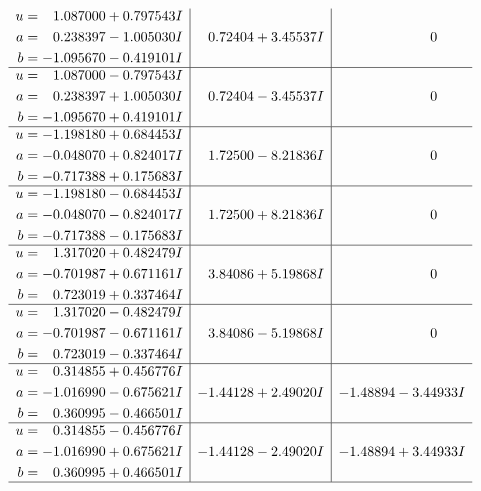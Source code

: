 \documentclass[1p]{elsarticle_modified}
\theoremstyle{definition}
\begin{document}
$$\begin{array}{c|c|c}
\begin{aligned}
u &= \phantom{-}1.087000 + 0.797543 I \\
a &= \phantom{-}0.238397 - 1.005030 I \\
b &= -1.095670 - 0.419101 I\end{aligned}
 & \phantom{-}0.72404 + 3.45537 I & \phantom{-0.000000 } 0 \\ \hline\begin{aligned}
u &= \phantom{-}1.087000 - 0.797543 I \\
a &= \phantom{-}0.238397 + 1.005030 I \\
b &= -1.095670 + 0.419101 I\end{aligned}
 & \phantom{-}0.72404 - 3.45537 I & \phantom{-0.000000 } 0 \\ \hline\begin{aligned}
u &= -1.198180 + 0.684453 I \\
a &= -0.048070 + 0.824017 I \\
b &= -0.717388 + 0.175683 I\end{aligned}
 & \phantom{-}1.72500 - 8.21836 I & \phantom{-0.000000 } 0 \\ \hline\begin{aligned}
u &= -1.198180 - 0.684453 I \\
a &= -0.048070 - 0.824017 I \\
b &= -0.717388 - 0.175683 I\end{aligned}
 & \phantom{-}1.72500 + 8.21836 I & \phantom{-0.000000 } 0 \\ \hline\begin{aligned}
u &= \phantom{-}1.317020 + 0.482479 I \\
a &= -0.701987 + 0.671161 I \\
b &= \phantom{-}0.723019 + 0.337464 I\end{aligned}
 & \phantom{-}3.84086 + 5.19868 I & \phantom{-0.000000 } 0 \\ \hline\begin{aligned}
u &= \phantom{-}1.317020 - 0.482479 I \\
a &= -0.701987 - 0.671161 I \\
b &= \phantom{-}0.723019 - 0.337464 I\end{aligned}
 & \phantom{-}3.84086 - 5.19868 I & \phantom{-0.000000 } 0 \\ \hline\begin{aligned}
u &= \phantom{-}0.314855 + 0.456776 I \\
a &= -1.016990 - 0.675621 I \\
b &= \phantom{-}0.360995 - 0.466501 I\end{aligned}
 & -1.44128 + 2.49020 I & -1.48894 - 3.44933 I \\ \hline\begin{aligned}
u &= \phantom{-}0.314855 - 0.456776 I \\
a &= -1.016990 + 0.675621 I \\
b &= \phantom{-}0.360995 + 0.466501 I\end{aligned}
 & -1.44128 - 2.49020 I & -1.48894 + 3.44933 I\\
 \hline 
 \end{array}$$\newpage
\end{document}

